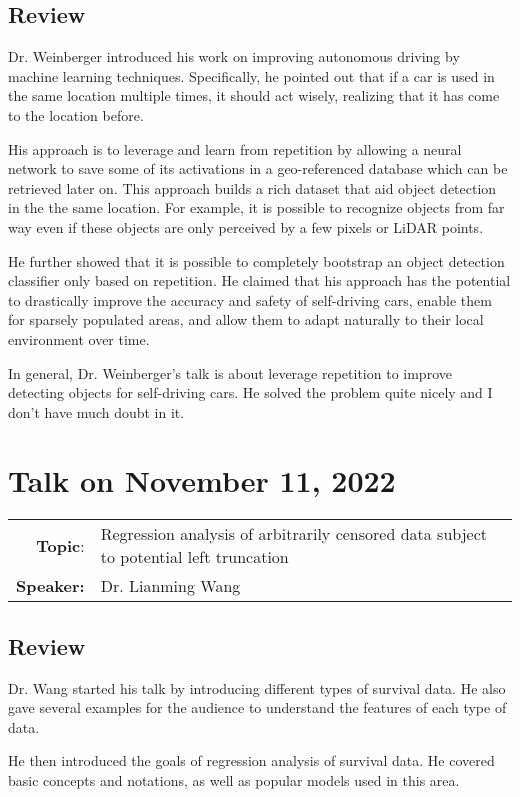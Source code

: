 \documentclass[11pt, oneside]{article}   	%
\begin{document}
\subsection{Review}

Dr. Weinberger introduced his work on improving autonomous driving by machine learning techniques. Specifically, he pointed out that if a car is used in the same location multiple times, it should act wisely, realizing that it has come to the location before. 

His approach is to leverage and learn from repetition by allowing a neural network to save some of its activations in a geo-referenced database which can be retrieved later on. This approach builds a rich dataset that aid object detection in the the same location. For example, it is possible to recognize objects from far way even if these objects are only perceived by a few pixels or LiDAR points. 

He further showed that it is possible to completely bootstrap an object detection classifier only based on repetition. He claimed that his approach has the potential to drastically improve the accuracy and safety of self-driving cars, enable them for sparsely populated areas, and allow them to adapt naturally to their local environment over time.

In general, Dr. Weinberger's talk is about leverage repetition to improve detecting objects for self-driving cars. He solved the problem quite nicely and I don't have much doubt in it. 


\newpage
\section{Talk on November 11, 2022}
\begin{tabularx} {\textwidth}{r X}
\textbf{Topic}: & Regression analysis of arbitrarily censored data subject to potential left truncation\\
\textbf{Speaker:} & Dr. Lianming Wang\\
\end{tabularx}

\subsection{Review}
Dr. Wang started his talk by introducing different types of survival data. He also gave several examples for the audience to understand the features of each type of data. 

He then introduced the goals of regression analysis of survival data. He covered basic concepts and notations, as well as popular models used in this area.
\end{document}
